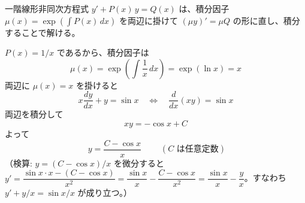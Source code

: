 
一階線形非同次方程式 $y' + P(x)\,y = Q(x)$ は、積分因子 $\mu(x) = \exp\left(\int P(x)\,dx\right)$ を両辺に掛けて $(\mu y)' = \mu Q$ の形に直し、積分することで解ける。

$P(x) = 1/x$ であるから、積分因子は
\[
\mu(x) = \exp\left(\int \frac{1}{x}\,dx\right) = \exp(\ln x) = x
\]
両辺に $\mu(x) = x$ を掛けると
\[
x\frac{dy}{dx} + y = \sin x
\quad\Longleftrightarrow\quad
\frac{d}{dx}(xy) = \sin x
\]
両辺を積分して
\[
xy = -\cos x + C
\]
よって
\[
\boxed{\; y = \frac{C - \cos x}{x} \;}
\qquad (C \text{ は任意定数})
\]
（検算: $y = (C-\cos x)/x$ を微分すると $y' = \dfrac{\sin x \cdot x - (C-\cos x)}{x^{2}} = \dfrac{\sin x}{x} - \dfrac{C-\cos x}{x^{2}} = \dfrac{\sin x}{x} - \dfrac{y}{x}$。すなわち $y' + y/x = \sin x / x$ が成り立つ。）
